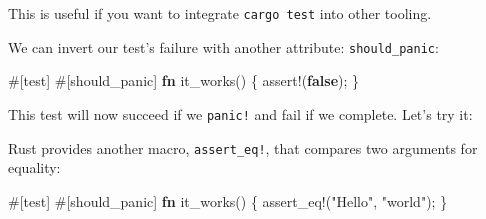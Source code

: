 \documentclass[a4paper,]{book}
\newenvironment{Shaded}{\begin{snugshade}}{\end{snugshade}}
\newcommand{\KeywordTok}[1]{\textcolor[rgb]{0.13,0.29,0.53}{\textbf{{#1}}}}
\newcommand{\StringTok}[1]{\textcolor[rgb]{0.31,0.60,0.02}{{#1}}}
\newcommand{\OtherTok}[1]{\textcolor[rgb]{0.56,0.35,0.01}{{#1}}}
\newcommand{\NormalTok}[1]{{#1}}
\begin{document}
This is useful if you want to integrate \texttt{cargo\ test} into other
tooling.

We can invert our test's failure with another attribute:
\texttt{should\_panic}:

\begin{Shaded}
\begin{Highlighting}[]
\OtherTok{#[}\NormalTok{test}\OtherTok{]}
\OtherTok{#[}\NormalTok{should_panic}\OtherTok{]}
\KeywordTok{fn} \NormalTok{it_works() \{}
    \OtherTok{assert!}\NormalTok{(}\KeywordTok{false}\NormalTok{);}
\NormalTok{\}}
\end{Highlighting}
\end{Shaded}

This test will now succeed if we \texttt{panic!} and fail if we
complete. Let's try it:

\begin{Shaded}
\end{Shaded}

Rust provides another macro, \texttt{assert\_eq!}, that compares two
arguments for equality:

\begin{Shaded}
\begin{Highlighting}[]
\OtherTok{#[}\NormalTok{test}\OtherTok{]}
\OtherTok{#[}\NormalTok{should_panic}\OtherTok{]}
\KeywordTok{fn} \NormalTok{it_works() \{}
    \OtherTok{assert_eq!}\NormalTok{(}\StringTok{"Hello"}\NormalTok{, }\StringTok{"world"}\NormalTok{);}
\NormalTok{\}}
\end{Highlighting}
\end{Shaded}
\end{document}
